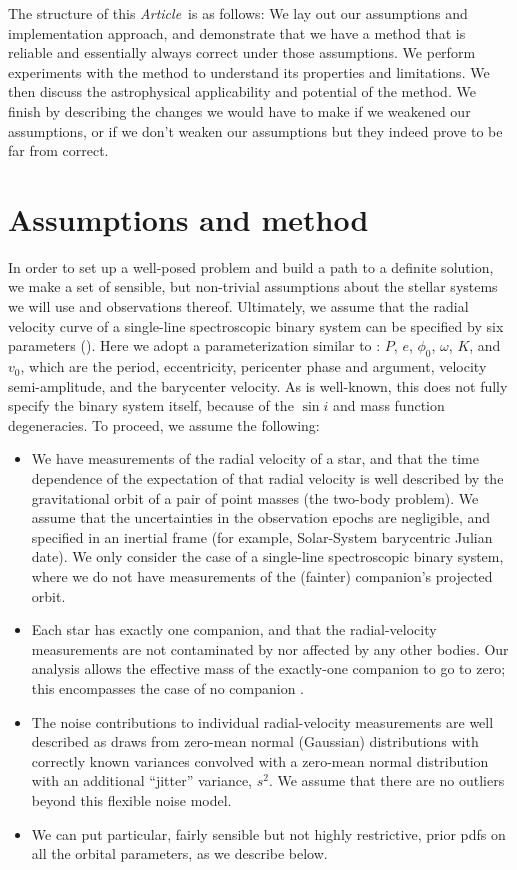 \documentclass[manuscript, letterpaper]{aastex6}
\newcommand{\documentname}{\textsl{Article}}
\begin{document}
The structure of this \documentname\ is as follows:
We lay out our assumptions and implementation approach, and demonstrate that we
have a method that is reliable and essentially always correct under
those assumptions.
We perform experiments with the method to understand its properties and
limitations.
We then discuss the astrophysical applicability and potential of the
method.
We finish by describing the changes we would have to make if we weakened our assumptions, or
if we don't weaken our assumptions but they indeed prove to be far from correct.

\section{Assumptions and method} \label{sec:method}

In order to set up a well-posed problem and build a path to a definite solution,
we make a set of sensible, but non-trivial assumptions about the stellar systems we will use
and observations thereof.
Ultimately, we assume that the radial velocity curve of a single-line
spectroscopic binary system can be specified by six parameters
(\citealt{Kepler:1609}).
Here we adopt a parameterization similar to \citealt{Murray:2010}:
$P$, $e$, $\phi_0$, $\omega$, $K$, and $v_0$, which are the period,
eccentricity, pericenter phase and argument, velocity semi-amplitude, and the
barycenter velocity.
As is well-known, this does not fully specify the binary system itself, because
of the $\sin{i}$ and mass function degeneracies.
To proceed, we assume the following:
\begin{itemize}\itemsep0ex  %
\item We have measurements of the radial velocity of a
  star, and that the time dependence of the expectation of that radial
  velocity is well described by the gravitational orbit of a pair of
  point masses (the two-body problem). We assume that the uncertainties
  in the observation epochs are negligible, and specified in an inertial frame (for
  example, Solar-System barycentric Julian date).
  We only consider the case of a single-line spectroscopic binary system,
  where we do not have measurements of the (fainter) companion's projected orbit.
\item  Each star has exactly one companion, and that the
  radial-velocity measurements are not contaminated by nor affected by
  any other bodies. Our analysis allows the effective mass of the
  exactly-one companion to go to zero; this encompasses the case of no companion .
\item The noise contributions to individual radial-velocity measurements are
  well described as draws from zero-mean normal (Gaussian) distributions with
  correctly known variances convolved with a zero-mean normal distribution with
  an additional ``jitter'' variance, $s^2$. We assume that there are no outliers
  beyond this flexible noise model.
\item We can put particular, fairly sensible but not highly restrictive,
  prior pdfs on all the orbital parameters, as we
  describe below.
\end{itemize}
\end{document}
